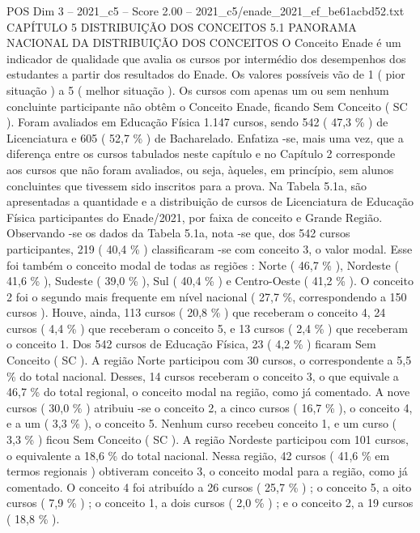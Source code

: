 \begin{textsample}{POS Dim 3 – 2021\_c5 – Score 2.00 – 2021\_c5/enade\_2021\_ef\_be61acbd52.txt}  \label{ex:f3_pos_083}
CAPÍTULO 5 DISTRIBUIÇÃO DOS CONCEITOS 5.1 PANORAMA NACIONAL DA DISTRIBUIÇÃO DOS CONCEITOS O Conceito Enade é um indicador de qualidade que avalia os cursos por intermédio dos desempenhos dos estudantes a partir dos resultados do Enade.
Os valores possíveis vão de 1 ( pior situação ) a 5 ( melhor situação ).
Os cursos com apenas um ou sem nenhum concluinte participante não obtêm o Conceito Enade, ficando Sem Conceito ( SC ).
Foram avaliados em Educação Física 1.147 cursos, sendo 542 ( 47,3 \% ) de Licenciatura e 605 ( 52,7 \% ) de Bacharelado.
Enfatiza -se, mais uma vez, que a diferença entre os cursos tabulados neste capítulo e no Capítulo 2 corresponde aos cursos que não foram avaliados, ou seja, àqueles, em princípio, sem alunos concluintes que tivessem sido inscritos para a prova.
Na Tabela 5.1a, são apresentadas a quantidade e a distribuição de cursos de Licenciatura de Educação Física participantes do Enade/2021, por faixa de conceito e Grande Região.
Observando -se os dados da Tabela 5.1a, nota -se que, dos 542 cursos participantes, 219 ( 40,4 \% ) classificaram -se com conceito 3, o valor modal.
Esse foi também o conceito modal de todas as regiões : Norte ( 46,7 \% ), Nordeste ( 41,6 \% ), Sudeste ( 39,0 \% ), Sul ( 40,4 \% ) e Centro-Oeste ( 41,2 \% ).
O conceito 2 foi o segundo mais frequente em nível nacional ( 27,7 \%, correspondendo a 150 cursos ).
Houve, ainda, 113 cursos ( 20,8 \% ) que receberam o conceito 4, 24 cursos ( 4,4 \% ) que receberam o conceito 5, e 13 cursos ( 2,4 \% ) que receberam o conceito 1.
Dos 542 cursos de Educação Física, 23 ( 4,2 \% ) ficaram Sem Conceito ( SC ).
A região Norte participou com 30 cursos, o correspondente a 5,5 \% do total nacional.
Desses, 14 cursos receberam o conceito 3, o que equivale a 46,7 \% do total regional, o conceito modal na região, como já comentado.
A nove cursos ( 30,0 \% ) atribuiu -se o conceito 2, a cinco cursos ( 16,7 \% ), o conceito 4, e a um ( 3,3 \% ), o conceito 5.
Nenhum curso recebeu conceito 1, e um curso ( 3,3 \% ) ficou Sem Conceito ( SC ).
A região Nordeste participou com 101 cursos, o equivalente a 18,6 \% do total nacional.
Nessa região, 42 cursos ( 41,6 \% em termos regionais ) obtiveram conceito 3, o conceito modal para a região, como já comentado.
O conceito 4 foi atribuído a 26 cursos ( 25,7 \% ) ; o conceito 5, a oito cursos ( 7,9 \% ) ; o conceito 1, a dois cursos ( 2,0 \% ) ; e o conceito 2, a 19 cursos ( 18,8 \% ).

\end{textsample}
